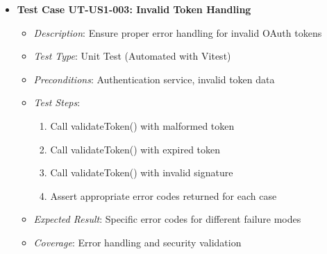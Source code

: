 \documentclass[12pt]{article}
\begin{document}
\begin{itemize}
  \item \textbf{Test Case UT-US1-003: Invalid Token Handling}
    \begin{itemize}
      \item \textit{Description}: Ensure proper error handling for invalid OAuth tokens
      \item \textit{Test Type}: Unit Test (Automated with Vitest)
      \item \textit{Preconditions}: Authentication service, invalid token data
      \item \textit{Test Steps}:
        \begin{enumerate}
          \item Call validateToken() with malformed token
          \item Call validateToken() with expired token
          \item Call validateToken() with invalid signature
          \item Assert appropriate error codes returned for each case
        \end{enumerate}
      \item \textit{Expected Result}: Specific error codes for different failure modes
      \item \textit{Coverage}: Error handling and security validation
    \end{itemize}
\end{itemize}
\end{document}

